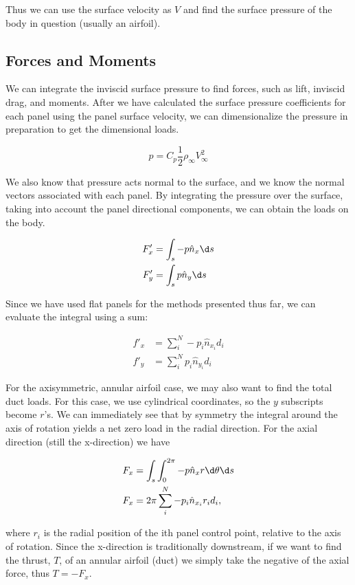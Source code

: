 \noindent Thus we can use the surface velocity as \(V\) and find the surface pressure of the body in question (usually an airfoil).

\subsection{Forces and Moments}

We can integrate the inviscid surface pressure to find forces, such as lift, inviscid drag, and moments.
After we have calculated the surface pressure coefficients for each panel using the panel surface velocity, we can dimensionalize the pressure in preparation to get the dimensional loads.

\begin{equation}
	p = C_p \frac{1}{2} \rho_\infty V_\infty^2
\end{equation}

We also know that pressure acts normal to the surface, and we know the normal vectors associated with each panel.
By integrating the pressure over the surface, taking into account the panel directional components, we can obtain the loads on the body.

\begin{equation}
	\begin{aligned}
	F'_x &= \int_s -p \hat{n}_x \d s   \\
	F'_y &= \int_s p \hat{n}_y \d s 
	\end{aligned}
\end{equation}

\noindent Since we have used flat panels for the methods presented thus far, we can evaluate the integral using a sum:

\begin{equation}
	\begin{aligned}
		f'_x &= \sum_i^N -p_{i} \hat{n}_{x_i} d_i  \\
	 	f'_y &= \sum_i^N p_{i} \hat{n}_{y_i} d_i
	\end{aligned}
\end{equation}

For the axisymmetric, annular airfoil case, we may also want to find the total duct loads.
For this case, we use cylindrical coordinates, so the \(y\) subscripts become \(r\)'s.
We can immediately see that by symmetry the integral around the axis of rotation yields a net zero load in the radial direction.
For the axial direction (still the x-direction) we have

\begin{equation}
	\begin{aligned}
		F_x &= \int_s \int_0^{2\pi} -p \hat{n}_x r \d \theta \d s \\
		F_x &= 2\pi \sum_i^N -p_{i} \hat{n}_{x_i} r_i d_i ,
	\end{aligned}
\end{equation}

\noindent where \(r_i\) is the radial position of the ith panel control point, relative to the axis of rotation.
Since the x-direction is traditionally downstream, if we want to find the thrust, \(T\), of an annular airfoil (duct) we simply take the negative of the axial force, thus \(T = -F_x\).
